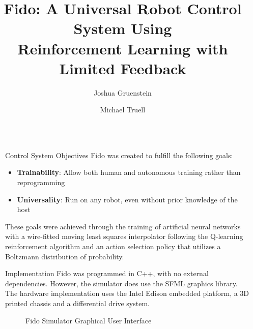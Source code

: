 \documentclass[final]{beamer}
\title{Fido: A Universal Robot Control System Using\\Reinforcement Learning with Limited Feedback}
\author{Joshua Gruenstein \and Michael Truell}
\institute{Horace Mann School}
\newlength{\sepwid}
\newlength{\onecolwid}
\begin{document}
\setlength{\belowcaptionskip}{2ex}
\setlength\belowdisplayshortskip{2ex}

\begin{frame}[t]
\begin{columns}[t]

\begin{column}{\sepwid}\end{column}
\begin{column}{\onecolwid}

	\begin{alertblock}{Control System Objectives}
		Fido was created to fulfill the following goals:
		\begin{itemize}
			\item \textbf{Trainability}: Allow both human and autonomous training rather than reprogramming
			\item \textbf{Universality}: Run on any robot, even without prior knowledge of the host
		\end{itemize}
		These goals were achieved through the training of artificial neural networks with a wire-fitted moving least squares interpolator following the Q-learning reinforcement algorithm and an action selection policy that utilizes a Boltzmann distribution of probability.
	\end{alertblock}

	\begin{block}{Implementation}
		Fido was programmed in C++, with no external dependencies.  However, the simulator does use the SFML graphics library.  The hardware implementation uses the Intel Edison embedded platform, a 3D printed chassis and a differential drive system.

		\begin{figure}
			\centering
			\caption{Fido Simulator Graphical User Interface}
		\end{figure}


\end{block}
\end{column}
\end{columns}
\end{frame}
\end{document}
